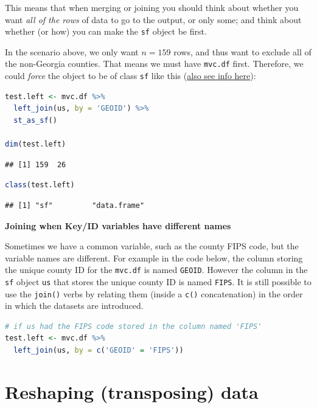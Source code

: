 \documentclass[
]{book}
\newcommand{\passthrough}[1]{#1}
\begin{document}
This means that when merging or joining you should think about whether you want \emph{all of the rows} of data to go to the output, or only some; and think about whether (or how) you can make the \passthrough{\lstinline!sf!} object be first.

In the scenario above, we only want \(n=159\) rows, and thus want to exclude all of the non-Georgia counties. That means we must have \passthrough{\lstinline!mvc.df!} first. Therefore, we could \emph{force} the object to be of class \passthrough{\lstinline!sf!} like this (\protect\hyperlink{st-as-sf}{also see info here}):

\begin{lstlisting}[language=R]
test.left <- mvc.df %>%
  left_join(us, by = 'GEOID') %>%
  st_as_sf()

dim(test.left)
\end{lstlisting}

\begin{lstlisting}
## [1] 159  26
\end{lstlisting}

\begin{lstlisting}[language=R]
class(test.left)
\end{lstlisting}

\begin{lstlisting}
## [1] "sf"         "data.frame"
\end{lstlisting}

\textbf{Joining when Key/ID variables have different names}

Sometimes we have a common variable, such as the county FIPS code, but the variable names are different. For example in the code below, the column storing the unique county ID for the \passthrough{\lstinline!mvc.df!} is named \passthrough{\lstinline!GEOID!}. However the column in the \passthrough{\lstinline!sf!} object \passthrough{\lstinline!us!} that stores the unique county ID is named \passthrough{\lstinline!FIPS!}. It is still possible to use the \passthrough{\lstinline!join()!} verbs by relating them (inside a \passthrough{\lstinline!c()!} concatenation) in the order in which the datasets are introduced.

\begin{lstlisting}[language=R]
# if us had the FIPS code stored in the column named 'FIPS'
test.left <- mvc.df %>%
  left_join(us, by = c('GEOID' = 'FIPS'))
\end{lstlisting}

\hypertarget{pivot_}{%
\section{Reshaping (transposing) data}\label{pivot_}}
\end{document}
